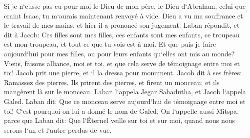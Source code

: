 \verse Si je n`eusse pas eu pour moi le Dieu de mon père, le Dieu d`Abraham, celui que craint Isaac, tu m`aurais maintenant renvoyé à vide. Dieu a vu ma souffrance et le travail de mes mains, et hier il a prononcé son jugement. 
\verse Laban répondit, et dit à Jacob: Ces filles sont mes filles, ces enfants sont mes enfants, ce troupeau est mon troupeau, et tout ce que tu vois est à moi. Et que puis-je faire aujourd`hui pour mes filles, ou pour leurs enfants qu`elles ont mis au monde? 
\verse Viens, faisons alliance, moi et toi, et que cela serve de témoignage entre moi et toi! 
\verse Jacob prit une pierre, et il la dressa pour monument. 
\verse Jacob dit à ses frères: Ramassez des pierres. Ils prirent des pierres, et firent un monceau; et ils mangèrent là sur le monceau. 
\verse Laban l`appela Jegar Sahadutha, et Jacob l`appela Galed. 
\verse Laban dit: Que ce monceau serve aujourd`hui de témoignage entre moi et toi! C`est pourquoi on lui a donné le nom de Galed. 
\verse On l`appelle aussi Mitspa, parce que Laban dit: Que l`Éternel veille sur toi et sur moi, quand nous nous serons l`un et l`autre perdus de vue. 
